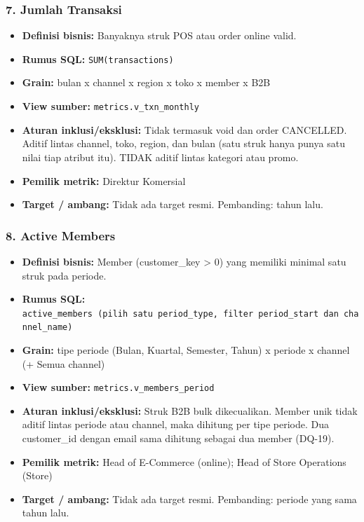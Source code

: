\documentclass[10pt,a4paper]{article}
\providecommand{\tightlist}{\setlength{\itemsep}{1pt}\setlength{\parskip}{0pt}}
\begin{document}
\subsubsection{7. Jumlah Transaksi}\label{jumlah-transaksi}

\begin{itemize}
\tightlist
\item
  \textbf{Definisi bisnis:} Banyaknya struk POS atau order online valid.
\item
  \textbf{Rumus SQL:} \texttt{SUM(transactions)}
\item
  \textbf{Grain:} bulan x channel x region x toko x member x B2B
\item
  \textbf{View sumber:} \texttt{metrics.v\_\allowbreak{}txn\_\allowbreak{}monthly}
\item
  \textbf{Aturan inklusi/eksklusi:} Tidak termasuk void dan order CANCELLED. Aditif lintas channel, toko, region, dan bulan (satu struk hanya punya satu nilai tiap atribut itu). TIDAK aditif lintas kategori atau promo.
\item
  \textbf{Pemilik metrik:} Direktur Komersial
\item
  \textbf{Target / ambang:} Tidak ada target resmi. Pembanding: tahun lalu.
\end{itemize}

\subsubsection{8. Active Members}\label{active-members}

\begin{itemize}
\tightlist
\item
  \textbf{Definisi bisnis:} Member (customer\_\allowbreak{}key \textgreater{} 0) yang memiliki minimal satu struk pada periode.
\item
  \textbf{Rumus SQL:} \texttt{active\_\allowbreak{}members\ (pilih\ satu\ period\_\allowbreak{}type,\ filter\ period\_\allowbreak{}start\ dan\ channel\_\allowbreak{}name)}
\item
  \textbf{Grain:} tipe periode (Bulan, Kuartal, Semester, Tahun) x periode x channel (+ Semua channel)
\item
  \textbf{View sumber:} \texttt{metrics.v\_\allowbreak{}members\_\allowbreak{}period}
\item
  \textbf{Aturan inklusi/eksklusi:} Struk B2B bulk dikecualikan. Member unik tidak aditif lintas periode atau channel, maka dihitung per tipe periode. Dua customer\_\allowbreak{}id dengan email sama dihitung sebagai dua member (DQ-19).
\item
  \textbf{Pemilik metrik:} Head of E-Commerce (online); Head of Store Operations (Store)
\item
  \textbf{Target / ambang:} Tidak ada target resmi. Pembanding: periode yang sama tahun lalu.
\end{itemize}
\end{document}
